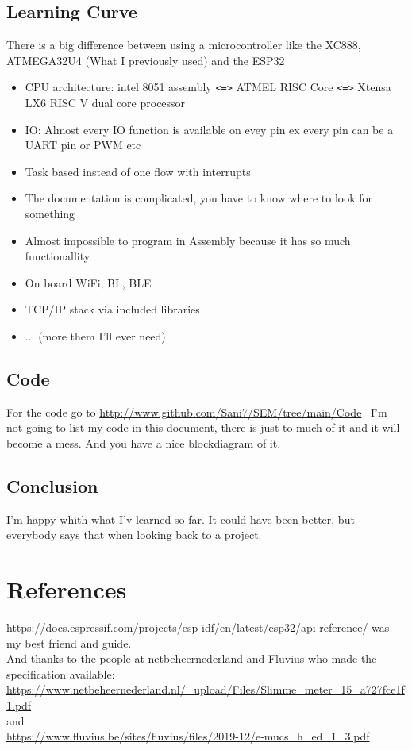 \documentclass[a4paper,twoside, 12pt]{report}
\theoremstyle{break}
\begin{document}
\section{Learning Curve}
There is a big difference between using a microcontroller like the XC888, ATMEGA32U4 (What I previously used) and the ESP32
\begin{itemize}
\item CPU architecture: intel 8051 assembly \verb|<=>| ATMEL RISC Core \verb|<=>|  Xtensa LX6 RISC V dual core processor
\item IO: Almost every IO function is available on evey pin ex every pin can be a UART pin or PWM etc
\item Task based instead of one flow with interrupts
\item The documentation is complicated, you have to know where to look for something
\item Almost impossible to program in Assembly because it has so much functionallity
\item On board WiFi, BL, BLE
\item TCP/IP stack via included libraries
\item ... (more them I'll ever need)
\end{itemize}
\section{Code}
For the code go to \url{http://www.github.com/Sani7/SEM/tree/main/Code} \ I'm not going to list my code in this document, there is just to much of it and it will become a mess. And you have a nice blockdiagram of it.
\section{Conclusion}
I'm happy whith what I'v learned so far. It could have been better, but everybody says that when looking back to a project.

\chapter{References}
\url{https://docs.espressif.com/projects/esp-idf/en/latest/esp32/api-reference/} was my best friend and guide.\\
And thanks to the people at netbeheernederland and Fluvius who made the specification available:\\
\url{https://www.netbeheernederland.nl/_upload/Files/Slimme_meter_15_a727fce1f1.pdf}\\
and\\ \url{https://www.fluvius.be/sites/fluvius/files/2019-12/e-mucs_h_ed_1_3.pdf}
\vfill
\eject
\end{document}
